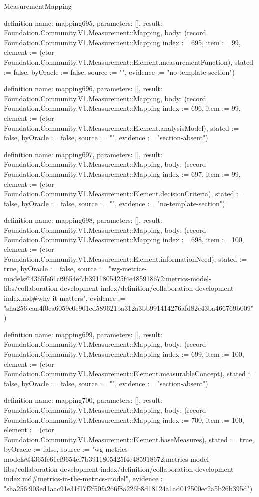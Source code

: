 \begin{lexlean}{MeasurementMapping}
\begin{semanticmodule}
definition{
  name: mapping695,
  parameters: [],
  result: Foundation.Community.V1.Measurement::Mapping,
  body: (record Foundation.Community.V1.Measurement::Mapping {index := 695, item := 99, element := (ctor Foundation.Community.V1.Measurement::Element.measurementFunction), stated := false, byOracle := false, source := "", evidence := "no-template-section"})
}

definition{
  name: mapping696,
  parameters: [],
  result: Foundation.Community.V1.Measurement::Mapping,
  body: (record Foundation.Community.V1.Measurement::Mapping {index := 696, item := 99, element := (ctor Foundation.Community.V1.Measurement::Element.analysisModel), stated := false, byOracle := false, source := "", evidence := "section-absent"})
}

definition{
  name: mapping697,
  parameters: [],
  result: Foundation.Community.V1.Measurement::Mapping,
  body: (record Foundation.Community.V1.Measurement::Mapping {index := 697, item := 99, element := (ctor Foundation.Community.V1.Measurement::Element.decisionCriteria), stated := false, byOracle := false, source := "", evidence := "no-template-section"})
}

definition{
  name: mapping698,
  parameters: [],
  result: Foundation.Community.V1.Measurement::Mapping,
  body: (record Foundation.Community.V1.Measurement::Mapping {index := 698, item := 100, element := (ctor Foundation.Community.V1.Measurement::Element.informationNeed), stated := true, byOracle := false, source := "wg-metrics-models@4365fe61cf9654ef7b3911805425f4e485918672:metrics-model-libs/collaboration-development-index/definition/collaboration-development-index.md#why-it-matters", evidence := "sha256:eaa4f0ca6059c0e901cd589621ba312a3bb991414276afd82c43ba466769b009"})
}

definition{
  name: mapping699,
  parameters: [],
  result: Foundation.Community.V1.Measurement::Mapping,
  body: (record Foundation.Community.V1.Measurement::Mapping {index := 699, item := 100, element := (ctor Foundation.Community.V1.Measurement::Element.measurableConcept), stated := false, byOracle := false, source := "", evidence := "section-absent"})
}

definition{
  name: mapping700,
  parameters: [],
  result: Foundation.Community.V1.Measurement::Mapping,
  body: (record Foundation.Community.V1.Measurement::Mapping {index := 700, item := 100, element := (ctor Foundation.Community.V1.Measurement::Element.baseMeasures), stated := true, byOracle := false, source := "wg-metrics-models@4365fe61cf9654ef7b3911805425f4e485918672:metrics-model-libs/collaboration-development-index/definition/collaboration-development-index.md#metrics-in-the-metrics-model", evidence := "sha256:903ed1aac91e31f17f2f50fa266f8a226b8d18124a1ad012500ec2a5b26b395d"})
}


\end{semanticmodule}
\end{lexlean}
